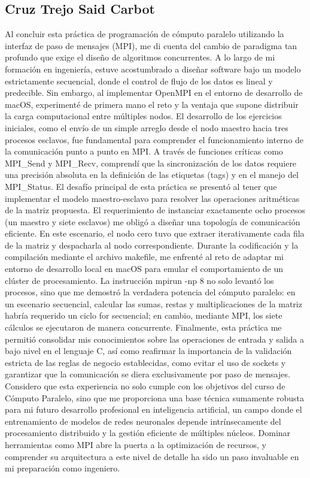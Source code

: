 \subsection{Cruz Trejo Said Carbot}
Al concluir esta práctica de programación de cómputo paralelo utilizando la interfaz de paso de mensajes (MPI), me di cuenta del cambio de paradigma tan profundo que exige el diseño de algoritmos concurrentes. A lo largo de mi formación en ingeniería, estuve acostumbrado a diseñar software bajo un modelo estrictamente secuencial, donde el control de flujo de los datos es lineal y predecible. Sin embargo, al implementar OpenMPI en el entorno de desarrollo de macOS, experimenté de primera mano el reto y la ventaja que supone distribuir la carga computacional entre múltiples nodos. 
El desarrollo de los ejercicios iniciales, como el envío de un simple arreglo desde el nodo maestro hacia tres procesos esclavos, fue fundamental para comprender el funcionamiento interno de la comunicación punto a punto en MPI. A través de funciones críticas como MPI\_Send y MPI\_Recv, comprendí que la sincronización de los datos requiere una precisión absoluta en la definición de las etiquetas (tags) y en el manejo del MPI\_Status. 
El desafío principal de esta práctica se presentó al tener que implementar el modelo maestro-esclavo para resolver las operaciones aritméticas de la matriz propuesta. El requerimiento de instanciar exactamente ocho procesos (un maestro y siete esclavos) me obligó a diseñar una topología de comunicación eficiente. En este escenario, el nodo cero tuvo que extraer iterativamente cada fila de la matriz y despacharla al nodo correspondiente. Durante la codificación y la compilación mediante el archivo makefile, me enfrenté al reto de adaptar mi entorno de desarrollo local en macOS para emular el comportamiento de un clúster de procesamiento. La instrucción mpirun -np 8 no solo levantó los procesos, sino que me demostró la verdadera potencia del cómputo paralelo: en un escenario secuencial, calcular las sumas, restas y multiplicaciones de la matriz habría requerido un ciclo for secuencial; en cambio, mediante MPI, los siete cálculos se ejecutaron de manera concurrente. 
Finalmente, esta práctica me permitió consolidar mis conocimientos sobre las operaciones de entrada y salida a bajo nivel en el lenguaje C, así como reafirmar la importancia de la validación estricta de las reglas de negocio establecidas, como evitar el uso de sockets y garantizar que la comunicación se diera exclusivamente por paso de mensajes. Considero que esta experiencia no solo cumple con los objetivos del curso de Cómputo Paralelo, sino que me proporciona una base técnica sumamente robusta para mi futuro desarrollo profesional en inteligencia artificial, un campo donde el entrenamiento de modelos de redes neuronales depende intrínsecamente del procesamiento distribuido y la gestión eficiente de múltiples núcleos. Dominar herramientas como MPI abre la puerta a la optimización de recursos, y comprender su arquitectura a este nivel de detalle ha sido un paso invaluable en mi preparación como ingeniero.

